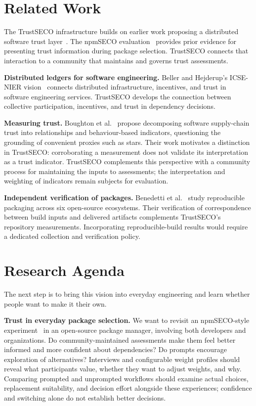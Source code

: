 \documentclass[10pt,conference]{IEEEtran}
\begin{document}
\section{Related Work}
The TrustSECO infrastructure builds on earlier work proposing a distributed software trust layer~\cite{hou2021trustseco}. The npmSECO evaluation~\cite{hou2024npmseco} provides prior evidence for presenting trust information during package selection. TrustSECO connects that interaction to a community that maintains and governs trust assessments.

\textbf{Distributed ledgers for software engineering.} Beller and Hejderup's ICSE-NIER vision~\cite{beller2019blockchain} connects distributed infrastructure, incentives, and trust in software engineering services. TrustSECO develops the connection between collective participation, incentives, and trust in dependency decisions.

\textbf{Measuring trust.} Boughton et al.~\cite{boughton2024decomposing} propose decomposing software supply-chain trust into relationships and behaviour-based indicators, questioning the grounding of convenient proxies such as stars. Their work motivates a distinction in TrustSECO: corroborating a measurement does not validate its interpretation as a trust indicator. TrustSECO complements this perspective with a community process for maintaining the inputs to assessments; the interpretation and weighting of indicators remain subjects for evaluation.

\textbf{Independent verification of packages.} Benedetti et al.~\cite{benedetti2025reproducible} study reproducible packaging across six open-source ecosystems. Their verification of correspondence between build inputs and delivered artifacts complements TrustSECO's repository measurements. Incorporating reproducible-build results would require a dedicated collection and verification policy.

\section{Research Agenda}
The next step is to bring this vision into everyday engineering and learn whether people want to make it their own.

\textbf{Trust in everyday package selection.} We want to revisit an npmSECO-style experiment~\cite{hou2024npmseco} in an open-source package manager, involving both developers and organizations. Do community-maintained assessments make them feel better informed and more confident about dependencies? Do prompts encourage exploration of alternatives? Interviews and configurable weight profiles should reveal what participants value, whether they want to adjust weights, and why. Comparing prompted and unprompted workflows should examine actual choices, replacement suitability, and decision effort alongside these experiences; confidence and switching alone do not establish better decisions.
\end{document}
